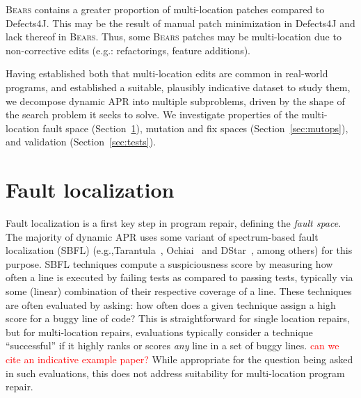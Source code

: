 \documentclass[10pt, conference]{IEEEtran}
\newcommand\todo[1]{\textcolor{red}{#1}}
\newcommand\bears{\textsc{Bears}\xspace}
\begin{document}
\bears contains a greater proportion of 
multi-location patches compared to Defects4J. This may be the 
result of manual patch minimization in Defects4J
and lack thereof in \bears.
Thus, some \bears patches may be multi-location due to
non-corrective edits (e.g.: refactorings, feature additions).

Having established both that multi-location edits are common in real-world
programs, and established a suitable, plausibly indicative dataset to study
them, we decompose dynamic APR into multiple subproblems, driven by the
shape of the search problem it seeks to solve. We 
investigate properties of the multi-location fault space (Section~\ref{secFL}),
mutation and fix spaces (Section~\ref{sec:mutops}), and validation
(Section~\ref{sec:tests}). 

\section{Fault localization} \label{secFL}


Fault localization is a first key step in program repair, defining the
\emph{fault space}. The majority of dynamic APR
uses some variant of spectrum-based fault localization (SBFL) (e.g.,Tarantula~\cite{tarantula},
Ochiai~\cite{ochiai} and DStar~\cite{wong2013dstar}, among others) for this purpose.
%
SBFL techniques compute a suspiciousness score by
measuring how often a line is executed by failing tests as compared to passing
tests, typically via some (linear) combination of their respective
coverage of a line. 
These techniques are often evaluated by asking: how often does a given technique assign a high 
score for a buggy line of code? This is straightforward for single location repairs, but for 
multi-location repairs, evaluations
typically consider a technique ``successful'' if it highly ranks or scores \emph{any} line in a
set of buggy lines. \todo{can we cite an indicative example paper?}
While appropriate for the question being asked in such evaluations, this does not address
suitability for multi-location program repair.%
\end{document}
